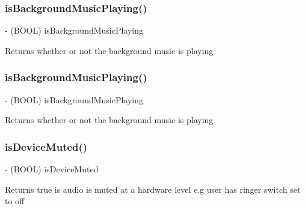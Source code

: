 \subsubsection{\texorpdfstring{is\+Background\+Music\+Playing()}{isBackgroundMusicPlaying()}\hspace{0.1cm}{\footnotesize\ttfamily [3/4]}}
{\footnotesize\ttfamily -\/ (B\+O\+OL) is\+Background\+Music\+Playing \begin{DoxyParamCaption}{ }\end{DoxyParamCaption}}

Returns whether or not the background music is playing \mbox{\label{interfaceCDAudioManager_a3b519950dee5dd8e79c8bbbf3c0f7e26}} 
\subsubsection{\texorpdfstring{is\+Background\+Music\+Playing()}{isBackgroundMusicPlaying()}\hspace{0.1cm}{\footnotesize\ttfamily [4/4]}}
{\footnotesize\ttfamily -\/ (B\+O\+OL) is\+Background\+Music\+Playing \begin{DoxyParamCaption}{ }\end{DoxyParamCaption}}

Returns whether or not the background music is playing \mbox{\label{interfaceCDAudioManager_a5a4df8bc83cbc6e6723196d3d4ec4974}} 
\subsubsection{\texorpdfstring{is\+Device\+Muted()}{isDeviceMuted()}\hspace{0.1cm}{\footnotesize\ttfamily [1/4]}}
{\footnotesize\ttfamily -\/ (B\+O\+OL) is\+Device\+Muted \begin{DoxyParamCaption}{ }\end{DoxyParamCaption}}

Returns true is audio is muted at a hardware level e.\+g user has ringer switch set to off \mbox{\label{interfaceCDAudioManager_a5a4df8bc83cbc6e6723196d3d4ec4974}} 
